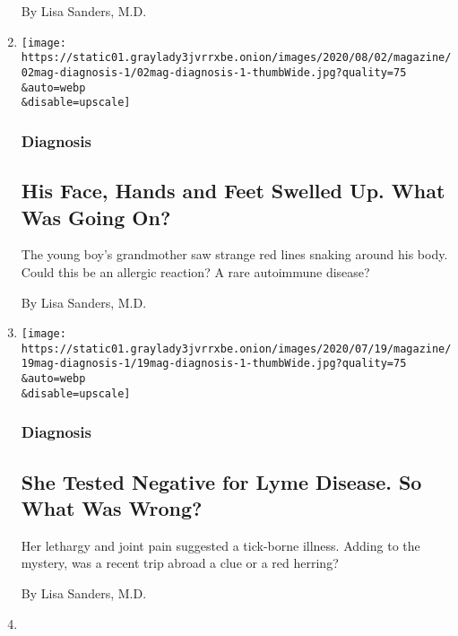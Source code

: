 \begin{enumerate}
  By Lisa Sanders, M.D.
\item
  \href{/2020/07/30/magazine/urticaria-multiforme.html}{}

  \texttt{[image: https://static01.graylady3jvrrxbe.onion/images/2020/08/02/magazine/02mag-diagnosis-1/02mag-diagnosis-1-thumbWide.jpg?quality=75\\\&auto=webp\\\&disable=upscale]}

  \hypertarget{diagnosis-2}{%
  \subsubsection{Diagnosis}\label{diagnosis-2}}

  \hypertarget{his-face-hands-and-feet-swelled-up-what-was-going-on}{%
  \subsection{His Face, Hands and Feet Swelled Up. What Was Going
  On?}\label{his-face-hands-and-feet-swelled-up-what-was-going-on}}

  The young boy's grandmother saw strange red lines snaking around his
  body. Could this be an allergic reaction? A rare autoimmune disease?

  By Lisa Sanders, M.D.
\item
  \href{/2020/07/15/magazine/borrelia-miyamotoi-diagnosis.html}{}

  \texttt{[image: https://static01.graylady3jvrrxbe.onion/images/2020/07/19/magazine/19mag-diagnosis-1/19mag-diagnosis-1-thumbWide.jpg?quality=75\\\&auto=webp\\\&disable=upscale]}

  \hypertarget{diagnosis-3}{%
  \subsubsection{Diagnosis}\label{diagnosis-3}}

  \hypertarget{she-tested-negative-for-lyme-disease-so-what-was-wrong}{%
  \subsection{She Tested Negative for Lyme Disease. So What Was
  Wrong?}\label{she-tested-negative-for-lyme-disease-so-what-was-wrong}}

  Her lethargy and joint pain suggested a tick-borne illness. Adding to
  the mystery, was a recent trip abroad a clue or a red herring?

  By Lisa Sanders, M.D.
\item
  \href{/2020/07/01/magazine/insulinoma-diagnosis.html}{}


\end{enumerate}
